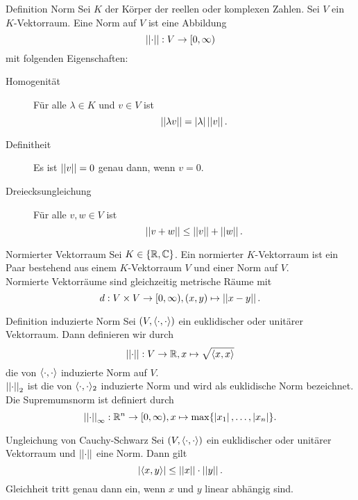 \documentclass[main.tex]{subfiles}
\begin{document}
\begin{karte}{Definition Norm}
    Sei \(K\) der Körper der reellen oder komplexen Zahlen. Sei \(V\) ein \(K\)-Vektorraum.
    Eine Norm auf \(V\) ist eine Abbildung
    \[ \left|\left|\cdot\right|\right| : V \rightarrow [0, \infty) \]
    mit folgenden Eigenschaften:
    \begin{description}
        \item[Homogenität] Für alle \(\lambda \in K\) und \(v \in V\) ist 
        \[ \left|\left|\lambda v\right|\right| = \left| \lambda \right| \left|\left|v\right|\right|. \]
        \item[Definitheit] Es ist \(\left|\left|v\right|\right| = 0\) genau dann, wenn \(v = 0\).
        \item[Dreiecksungleichung] Für alle \(v, w \in V\) ist
        \[ \left|\left|v+w\right|\right| \leq \left|\left|v\right|\right| + \left|\left|w\right|\right|. \]   
    \end{description}
\end{karte}

\begin{karte}{Normierter Vektorraum}
    Sei \(K \in \{\mathbb{R}, \mathbb{C}\}\). Ein normierter \(K\)-Vektorraum ist ein Paar bestehend
    aus einem \(K\)-Vektorraum \(V\) und einer Norm auf \(V\).\\
    Normierte Vektorräume sind gleichzeitig metrische Räume mit
    \[ d : V\times V \rightarrow [0, \infty), (x, y) \mapsto \left|\left|x-y\right|\right|. \]
\end{karte}

\begin{karte}{Definition induzierte Norm}
    Sei \((V, \langle \cdot, \cdot \rangle)\) ein euklidischer oder unitärer Vektorraum.
    Dann definieren wir durch
    \[ \left|\left|\cdot\right|\right| : V \rightarrow \mathbb{R}, x \mapsto \sqrt{\langle x, x \rangle} \]
    die von \(\langle \cdot, \cdot \rangle\) induzierte Norm auf \(V\).\\
    \(\left|\left|\cdot\right|\right|_2\) ist die von \(\langle \cdot, \cdot \rangle_2\) induzierte Norm und
    wird als euklidische Norm bezeichnet.\\
    Die Supremumsnorm ist definiert durch 
    \[ \left|\left|\cdot\right|\right|_\infty : \mathbb{R}^n \rightarrow [0,\infty), 
    x \mapsto \max\{\left| x_1 \right|, \ldots, \left| x_n \right|\}. \]
\end{karte}

\begin{karte}{Ungleichung von Cauchy-Schwarz}
    Sei \((V, \langle \cdot, \cdot \rangle)\) ein euklidischer oder unitärer Vektorraum
    und \(\left|\left|\cdot\right|\right|\) eine Norm. Dann gilt
    \[ \left| \langle x, y \rangle \right| \leq \left|\left|x\right|\right| \cdot \left|\left|y\right|\right|. \]
    Gleichheit tritt genau dann ein, wenn \(x\) und \(y\) linear abhängig sind.
\end{karte}
\end{document}
